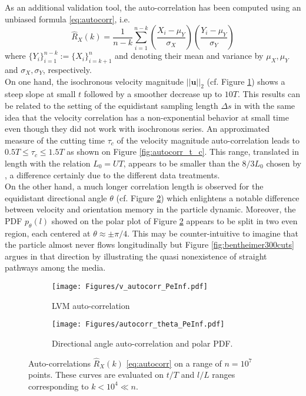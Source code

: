 As an additional validation tool, the auto-correlation has been computed using an unbiased formula \eqref{eq:autocorr}, i.e.
\begin{equation}
\hat R_X(k) = \frac{1}{n-k} \sum_{i=1}^{n-k} \left(\frac{X_i-\mu_Y}{\sigma_X}\right)\left(\frac{Y_i-\mu_Y}{\sigma_Y}\right)
\label{eq:autocorr}
\end{equation}
where $\{Y_i\}_{i=1}^{n-k} := \{X_{i}\}_{i=k+1}^{n}$ and denoting their mean and variance by $\mu_X,\mu_Y$ and $\sigma_X, \sigma_Y$, respectively.\\
On one hand, the isochronous velocity magnitude $||\textbf{u}||_2$  (cf. Figure \ref{fig:autocorrv_peinf}) shows a steep slope at small $t$ followed by a smoother decrease up to $10T$.
This results can be related to the setting of the equidistant sampling length $\Delta s$ in \citet{Puyguiraud2019} with the same idea that the velocity correlation has a non-exponential behavior at small time even though they did not work with isochronous series. 
An approximated measure of the cutting time $\tau_c$ of the velocity magnitude auto-correlation leads to $0.5T \leq \tau_c \leq 1.5T$ as shown on Figure \ref{fig:autocorr_t_c}. 
This range, translated in length with the relation $L_0=U T$, appears to be smaller than the $8/3L_0$ chosen by \citet{Puyguiraud2019}, a difference certainly due to the different data treatments.\\
On the other hand, a much longer correlation length is observed for the equidistant directional angle $\theta$ (cf. Figure \ref{fig:autocorrt_peinf}) which enlightens a notable difference between velocity and orientation memory in the particle dynamic.
Moreover, the PDF $p_\theta(l)$ showed on the polar plot of Figure \ref{fig:autocorrt_peinf} appears to be split in two even region, each centered at $\theta\approx\pm\pi/4$. 
This may be counter-intuitive to imagine that the particle almost never flows longitudinally but Figure \ref{fig:bentheimer300cuts} argues in that direction by illustrating the quasi nonexistence of straight pathways among the media.\\
\begin{figure}
	\centering
	\begin{subfigure}[b]{0.49\textwidth}
		\centering
		\texttt{[image: Figures/v\_autocorr\_PeInf.pdf]}
		\caption{LVM auto-correlation}
		\label{fig:autocorrv_peinf}
	\end{subfigure}
	\hfill
	\begin{subfigure}[b]{0.49\textwidth}
		\centering
		\texttt{[image: Figures/autocorr\_theta\_PeInf.pdf]}
		\caption{Directional angle auto-correlation and polar PDF.}
		\label{fig:autocorrt_peinf}
	\end{subfigure}
	\caption{Auto-correlations $\hat{R}_X(k)$ \eqref{eq:autocorr} on a range of $n=10^7$ points. These curves are evaluated on $t/T$ and $l/L$ ranges corresponding to $k<10^4 \ll n$.}
	\label{fig:autocorr_peinf}
\end{figure}

